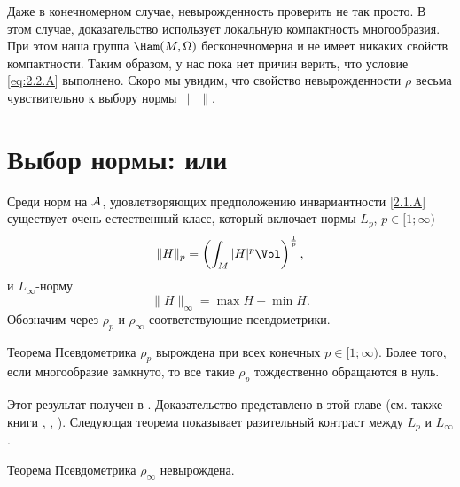 Даже в конечномерном случае, невырожденность проверить не так просто.
В этом случае, доказательство использует локальную компактность многообразия.
При этом наша группа $\Ham (M, \Omega)$ бесконечномерна и не имеет никаких свойств компактности.
Таким образом, у нас пока нет причин верить, что условие \ref{eq:2.2.A} выполнено.
Скоро мы увидим, что свойство невырожденности $\rho$ весьма чувствительно к выбору нормы~$\|\ \|$.

\section[\texorpdfstring{Выбор нормы: $L_p$ или $L_\infty$}{Выбор нормы: Lₚ или L∞}]{Выбор нормы:  или }

Среди норм на $\mathcal{A}$, удовлетворяющих предположению инвариантности
\ref{2.1.A} существует очень естественный класс, который включает
нормы $L_p$, $p \in [1;\infty)$
\[\|H\|_p=\left(\int_M|H|^p\Vol\right)^{\frac1p},\]
и $L_\infty$-норму 
\[\|H\|_\infty = \max H - \min H.\]
Обозначим через $\rho_p$ и $\rho_\infty$ соответствующие псевдометрики.

\begin{thm}{Теорема}\label{2.3.A}
Псевдометрика $\rho_p$ вырождена при всех конечных $p \in [1;\infty)$.
Более того, если многообразие замкнуто, то все такие $\rho_p$ тождественно обращаются в нуль.
\end{thm}

Этот результат получен в \cite{EP}.
Доказательство представлено в этой главе (см. также книги \cite{HZ}, \cite{MS}, \cite{AK}).
Следующая теорема показывает разительный контраст между $L_p$ и $L_\infty$.

\begin{thm}{Теорема}\label{2.3.B}
Псевдометрика $\rho_\infty$ невырождена.
\end{thm}


